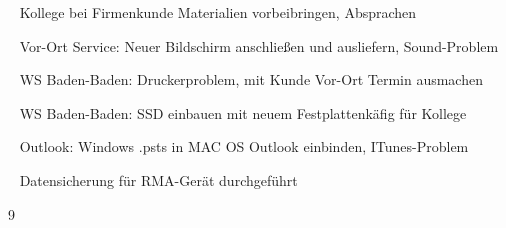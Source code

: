 {{	\textbullet~ Kollege bei Firmenkunde Materialien vorbeibringen, Absprachen\par
	\textbullet~ Vor-Ort Service: Neuer Bildschirm anschließen und ausliefern, Sound-Problem\par
	\textbullet~ WS Baden-Baden: Druckerproblem, mit Kunde Vor-Ort Termin ausmachen\par
	\textbullet~ WS Baden-Baden: SSD einbauen mit neuem Festplattenkäfig für Kollege\par
	\textbullet~ Outlook: Windows .psts in MAC OS Outlook einbinden, ITunes-Problem\par
	\textbullet~ Datensicherung für RMA-Gerät durchgeführt
	}{}{9}
}{}
\Unterschrift
\newpage
